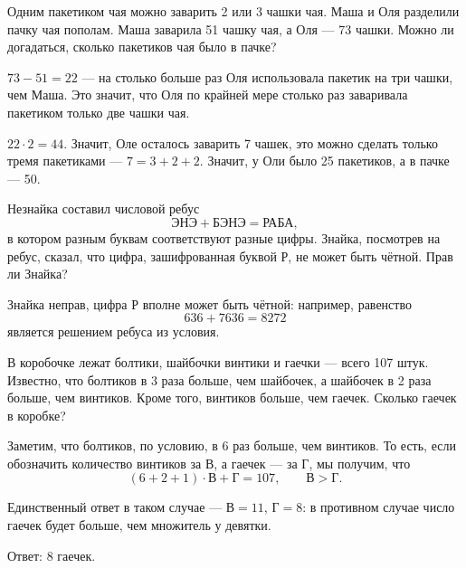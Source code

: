 \begin{itemize}

	\itA Одним пакетиком чая можно заварить 2 или 3 чашки чая. Маша и Оля разделили пачку чая пополам. Маша заварила 51 чашку чая, а Оля — 73 чашки. Можно ли догадаться, сколько пакетиков чая было в пачке?
	
	\itr $73-51 = 22$ — на столько больше раз Оля использовала пакетик на три чашки, чем Маша. Это значит, что Оля по крайней мере столько раз заваривала пакетиком только две чашки чая.
	
	$22 \cdot 2 = 44$. Значит, Оле осталось заварить 7 чашек, это можно сделать только тремя пакетиками — $7=3+2+2$. Значит, у Оли было 25 пакетиков, а в пачке — 50.
	
	\itB Незнайка составил числовой ребус
	$$\text{ЭНЭ}+\text{БЭНЭ}=\text{РАБА},$$
	в котором разным буквам соответствуют разные цифры. Знайка, посмотрев на ребус, сказал, что цифра, зашифрованная буквой Р, не может быть чётной. Прав ли Знайка?
	
	\itr Знайка неправ, цифра Р вполне может быть чётной: например, равенство
	$$636+7636=8272$$
	является решением ребуса из условия.
	
	\itC В коробочке лежат болтики, шайбочки винтики и гаечки — всего 107 штук. Известно, что болтиков в 3 раза больше, чем шайбочек, а шайбочек в 2 раза больше, чем винтиков. Кроме того, винтиков больше, чем гаечек. Сколько гаечек в коробке?
	
	\itr Заметим, что болтиков, по условию, в 6 раз больше, чем винтиков. То есть, если обозначить количество винтиков за В, а гаечек — за Г, мы получим, что
	$$(6+2+1) \cdot \text{В} + \text{Г} = 107,\qquad \text{В} > \text{Г}.$$
	
	Единственный ответ в таком случае — $\text{В} = 11$, $\text{Г} = 8$: в противном случае число гаечек будет больше, чем множитель у девятки.
	
	Ответ: 8 гаечек.

\end{itemize}